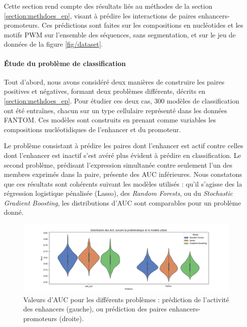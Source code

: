 \documentclass[french]{llncs}
\begin{document}
Cette section rend compte des résultats liés au méthodes de la section \ref{section:methdoes_ep}, visant à prédire les interactions de paires enhancers- promoteurs. Ces prédictions sont faites sur les compositions en nucléotides et les motifs PWM sur l'ensemble des séquences, sans segmentation, et sur le jeu de données de la figure \ref{fig/dataset}.



\paragraph{Étude du problème de classification}
Tout d'abord, nous avons considéré deux manières de construire les paires positives et négatives, formant deux problèmes différents, décrits en \ref{section:methdoes_ep}. Pour étudier ces deux cas, 300 modèles de classification ont été entraînes, chacun sur un type cellulaire représenté dans les données FANTOM. Ces modèles sont construits en prenant comme variables les compositions nucléotidiques de l'enhancer et du promoteur.

Le problème consistant à prédire les paires dont l'enhancer est actif contre celles dont l'enhancer est inactif s'est avéré plus évident à prédire en classification. Le second problème, prédisant l'expression simultanée contre seulement l'un des membres exprimés dans la paire, présente des AUC inférieures. Nous constatons que ces résultats sont cohérents suivant les modèles utilisés : qu'il s'agisse des la régression logistique pénalisée (Lasso), des \textit{Random Forests}, ou du \textit{Stochastic Gradient Boosting}, les distributions d'AUC sont comparables pour un problème donné.

\begin{figure}[h]
\begin{center}
 	\includegraphics[width=1\linewidth]{Images_FANTOM/AUC_problems_models.png}
 \caption{Valeurs d'AUC pour les différents problèmes : prédiction de l'activité des enhancers (gauche), ou prédiction des paires enhancers-promoteurs (droite).} \label{fig/treillis_at}
\end{center}
\end{figure}
\end{document}
